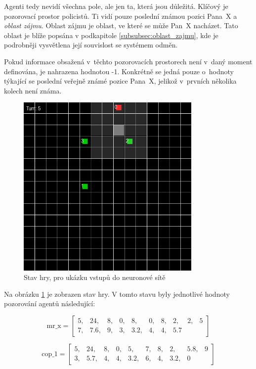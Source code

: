 Agenti tedy nevidí všechna pole, ale jen ta, která jsou důležitá.
Klíčový je pozorovací prostor policistů.
Ti vidí pouze poslední známou pozici Pana~X a \emph{oblast zájmu}.
Oblast zájmu je oblast, ve které se může Pan~X nacházet.
Tato oblast je blíže popsána v podkapitole  \ref{subsubsec:oblast_zajmu}, kde je podrobněji vysvětlena její souvislost se systémem odměn.

Pokud informace obsažená v~těchto pozorovacích prostorech není v~daný moment definována, je nahrazena hodnotou -1.
Konkrétně se jedná pouze o~hodnoty týkající se poslední veřejně známé pozice Pana~X, jelikož v~prvních několika kolech není známa.

\begin{figure}[H]
	\centering
	\includegraphics[width=0.8\textwidth]{obrazky-figures/game_inputs}
      \caption{Stav hry, pro ukázku vstupů do neuronové sítě}
    \label{fig:game_input}
\end{figure}
Na obrázku \ref{fig:game_input} je zobrazen stav hry.
V tomto stavu byly jednotlivé hodnoty pozorování agentů následující:

\[
\text{mr\_x} = \begin{bmatrix}
5, & 24, & 8, & 0, & 8, & 0, & 8, & 2, & 2, & 5 \\
7, & 7.6, & 9, & 3, & 3.2, & 4, & 4, & 5.7
\end{bmatrix}
\]

\[
\text{cop\_1} = \begin{bmatrix}
5, & 24, & 8, & 0, & 5, & 7, & 8, & 2, & 5.8, & 9 \\
3, & 5.7, & 4, & 4, & 3.2, & 6, & 4, & 3.2, & 0
\end{bmatrix}
\]


